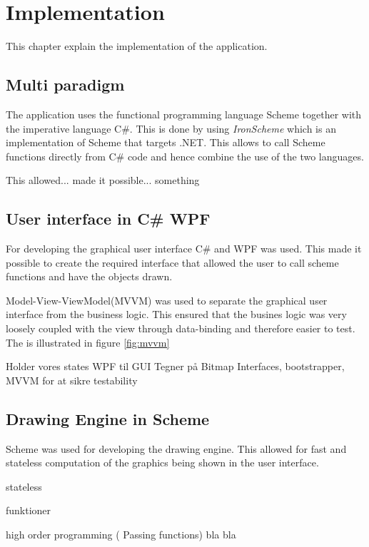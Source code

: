 \chapter{Implementation} 
\label{chp:impl}

This chapter explain the implementation of the application.

\section{Multi paradigm}
The application uses the functional programming language Scheme together with the imperative language C\#. This is done by using \emph{IronScheme} which is an implementation of Scheme that targets .NET. This allows to call Scheme functions directly from C\# code and hence combine the use of the two languages.

This allowed... made it possible... something

\section{User interface in C\# WPF}
For developing the graphical user interface C\# and WPF was used. This made it possible to create the required interface that allowed the user to call scheme functions and have the objects drawn. 

Model-View-ViewModel(MVVM) was used to separate the graphical user interface from the business logic.  This ensured that the busines logic was very loosely coupled with the view through data-binding and therefore easier to test. The is illustrated in figure \ref{fig:mvvm}



Holder vores states
WPF til GUI
Tegner på Bitmap
Interfaces, bootstrapper, MVVM for at sikre testability

\section{Drawing Engine in Scheme}
Scheme was used for developing the drawing engine. This allowed for fast and stateless computation of the graphics being shown in the user interface. 

stateless

funktioner

high order programming ( Passing functions) bla bla